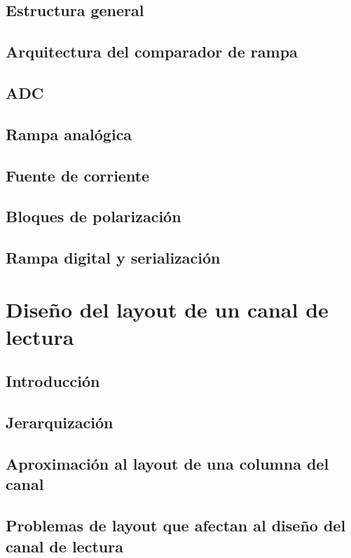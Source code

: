 \documentclass[12pt,a4paper,oneside,titlepage]{report}
\begin{document}
\section{Estructura general}

\section{Arquitectura del comparador de rampa}

\section{ADC}

\section{Rampa analógica}

\section{Fuente de corriente}

\section{Bloques de polarización}

\section{Rampa digital y serialización}

\chapter{Diseño del layout de un canal de lectura}

\section{Introducción}

\section{Jerarquización}

\section{Aproximación al layout de una columna del canal}

\section{Problemas de layout que afectan al diseño del canal de lectura}
\end{document}
